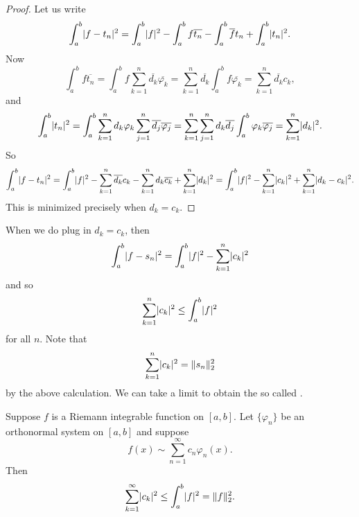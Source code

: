 \begin{proof}
Let us write
\begin{equation*}
\int_a^b \lvert {f-t_n} \rvert^2
=
\int_a^b \lvert {f} \rvert^2
-
\int_a^b f \overline{t_n}
-
\int_a^b \overline{f} t_n
+
\int_a^b \lvert {t_n} \rvert^2 .
\end{equation*}
Now
\begin{equation*}
\int_a^b f \overline{t_n}
=
\int_a^b f \sum_{k=1}^n \overline{d_k} \overline{\varphi_k}
=
 \sum_{k=1}^n \overline{d_k} \int_a^b f \overline{\varphi_k}
=
 \sum_{k=1}^n \overline{d_k} c_k ,
\end{equation*}
and
\begin{equation*}
\int_a^b \lvert {t_n} \rvert^2
=
\int_a^b
\sum_{k=1}^n d_k \varphi_k
\sum_{j=1}^n \overline{d_j} \overline{\varphi_j}
=
\sum_{k=1}^n
\sum_{j=1}^n 
d_k
\overline{d_j} 
\int_a^b
\varphi_k
\overline{\varphi_j}
=
\sum_{k=1}^n
\lvert {d_k} \rvert^2 .
\end{equation*}
So
\begin{equation*}
\int_a^b \lvert {f-t_n} \rvert^2
=
\int_a^b \lvert {f} \rvert^2
-
\sum_{k=1}^n \overline{d_k} c_k
-
\sum_{k=1}^n d_k \overline{c_k}
+
\sum_{k=1}^n
\lvert {d_k} \rvert^2
=
\int_a^b \lvert {f} \rvert^2
-
\sum_{k=1}^n \lvert {c_k} \rvert^2
+
\sum_{k=1}^n
\lvert {d_k-c_k} \rvert^2 .
\end{equation*}
This is minimized precisely when $d_k = c_k$.
\end{proof}

When we do plug in $d_k = c_k$, then
\begin{equation*}
\int_a^b \lvert {f-s_n} \rvert^2
=
\int_a^b \lvert {f} \rvert^2
-
\sum_{k=1}^n \lvert {c_k} \rvert^2
\end{equation*}
and so
\begin{equation*}
\sum_{k=1}^n \lvert {c_k} \rvert^2
\leq
\int_a^b \lvert {f} \rvert^2
\end{equation*}
for all $n$.  Note that
\begin{equation*}
\sum_{k=1}^n \lvert {c_k} \rvert^2 = \lVert {s_n} \rVert_2^2
\end{equation*}
by the above calculation.
We can take a limit to obtain the so called
\emph{}.

\begin{thm} \label{thm:bessels}
Suppose $f$ is a Riemann integrable function on $[a,b]$.
Let $\{ \varphi_n \}$ be an orthonormal system on $[a,b]$ and
suppose
\begin{equation*}
f(x) \sim \sum_{n=1}^\infty c_n \varphi_n(x) .
\end{equation*}
Then
\begin{equation*}
\sum_{k=1}^\infty \lvert {c_k} \rvert^2
\leq
\int_a^b \lvert {f} \rvert^2
= \lVert {f} \rVert_2^2 .
\end{equation*}
\end{thm}

